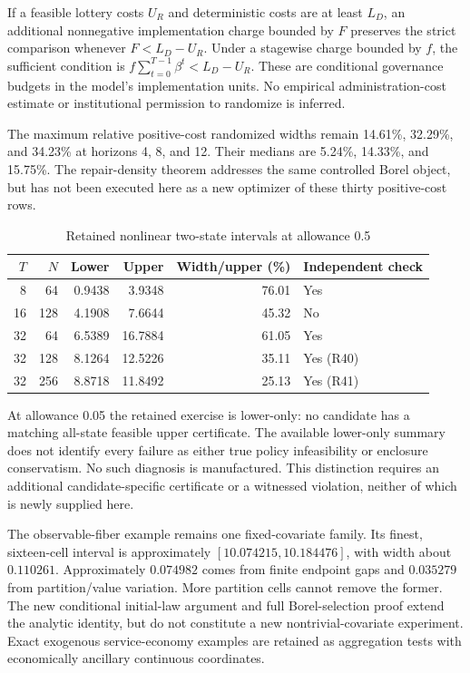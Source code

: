 If a feasible lottery costs $U_R$ and deterministic costs are at least $L_D$, an additional nonnegative implementation charge bounded by $F$ preserves the strict comparison whenever $F<L_D-U_R$. Under a stagewise charge bounded by $f$, the sufficient condition is $f\sum_{t=0}^{T-1}\beta^t<L_D-U_R$. These are conditional governance budgets in the model's implementation units. No empirical administration-cost estimate or institutional permission to randomize is inferred.

The maximum relative positive-cost randomized widths remain 14.61\%, 32.29\%, and 34.23\% at horizons 4, 8, and 12. Their medians are 5.24\%, 14.33\%, and 15.75\%. The repair-density theorem addresses the same controlled Borel object, but has not been executed here as a new optimizer of these thirty positive-cost rows.

\begin{table}[h]\centering\small
\caption{Retained nonlinear two-state intervals at allowance 0.5}
\begin{tabular}{rrrrrl}\toprule
$T$&$N$&Lower&Upper&Width/upper (\%)&Independent check\\\midrule
8&64&0.9438&3.9348&76.01&Yes\\
16&128&4.1908&7.6644&45.32&No\\
32&64&6.5389&16.7884&61.05&Yes\\
32&128&8.1264&12.5226&35.11&Yes (R40)\\
32&256&8.8718&11.8492&25.13&Yes (R41)\\\bottomrule
\end{tabular}\end{table}
At allowance 0.05 the retained exercise is lower-only: no candidate has a matching all-state feasible upper certificate. The available lower-only summary does not identify every failure as either true policy infeasibility or enclosure conservatism. No such diagnosis is manufactured. This distinction requires an additional candidate-specific certificate or a witnessed violation, neither of which is newly supplied here.

The observable-fiber example remains one fixed-covariate family. Its finest, sixteen-cell interval is approximately $[10.074215,10.184476]$, with width about $0.110261$. Approximately $0.074982$ comes from finite endpoint gaps and $0.035279$ from partition/value variation. More partition cells cannot remove the former. The new conditional initial-law argument and full Borel-selection proof extend the analytic identity, but do not constitute a new nontrivial-covariate experiment. Exact exogenous service-economy examples are retained as aggregation tests with economically ancillary continuous coordinates.


